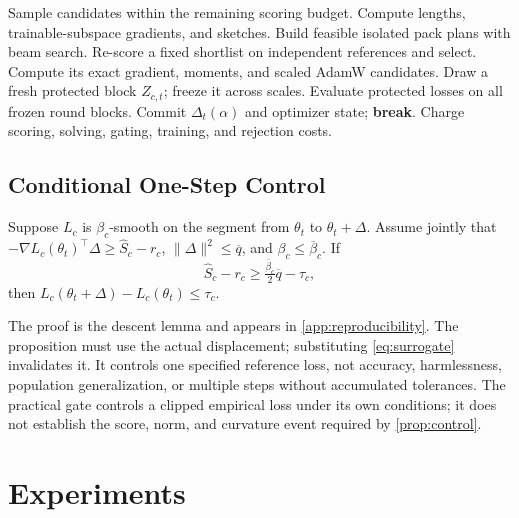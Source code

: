 \documentclass{article}
\begin{document}
\begin{algorithm}[t]
\caption{One Scheduling and Update Round}
\label{alg:scheduler}
\begin{algorithmic}[1]
\STATE Sample candidates within the remaining scoring budget.
\STATE Compute lengths, trainable-subspace gradients, and sketches.
\STATE Build feasible isolated pack plans with beam search.
\STATE Re-score a fixed shortlist on independent references and select.
\STATE Compute its exact gradient, moments, and scaled AdamW candidates.
  \STATE Draw a fresh protected block $Z_{c,t}$; freeze it across scales.
\ENDFOR
{}
  \STATE Evaluate protected losses on all frozen round blocks.
    \STATE Commit $\Delta_t(\alpha)$ and optimizer state; \textbf{break}.
  \ENDIF
\ENDFOR
\STATE Charge scoring, solving, gating, training, and rejection costs.
\end{algorithmic}
\end{algorithm}

\subsection{Conditional One-Step Control}

\begin{proposition}
\label{prop:control}
Suppose $L_c$ is $\beta_c$-smooth on the segment from $\theta_t$ to
$\theta_t+\Delta$. Assume jointly that
$-\nabla L_c(\theta_t)^\top\Delta\ge\widehat S_c-r_c$,
$\|\Delta\|^2\le\overline q$, and
$\beta_c\le\overline\beta_c$. If
\begin{equation}
\widehat S_c-r_c\ge
\tfrac{\overline\beta_c}{2}\overline q-\tau_c,
\end{equation}
then
$L_c(\theta_t+\Delta)-L_c(\theta_t)\le\tau_c$.
\end{proposition}

The proof is the descent lemma and appears in
\cref{app:reproducibility}. The proposition must use the actual displacement;
substituting \cref{eq:surrogate} invalidates it. It controls one specified
reference loss, not accuracy, harmlessness, population generalization, or
multiple steps without accumulated tolerances. The practical gate controls a
clipped empirical loss under its own conditions; it does not establish the
score, norm, and curvature event required by \cref{prop:control}.

\section{Experiments}
\label{sec:experiments}
\end{document}
